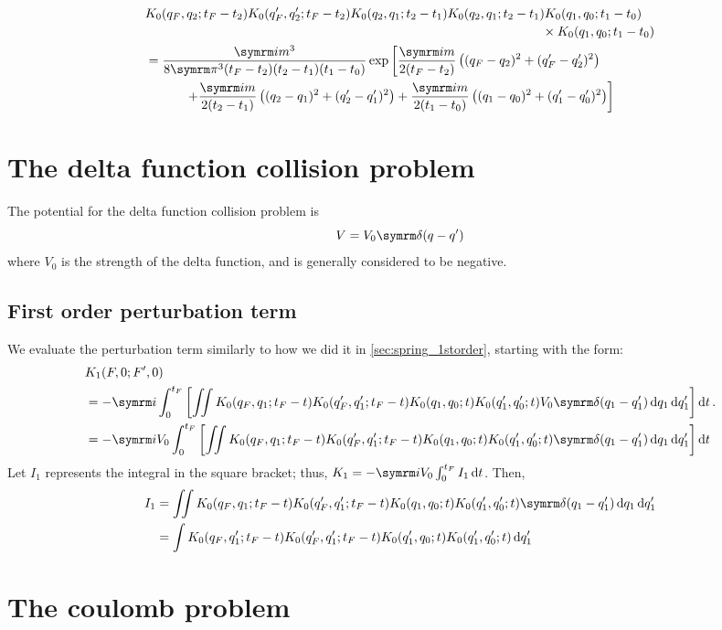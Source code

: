 \begin{align}
    &\begin{multlined}[t]
        K_0(q_F, q_2; t_F - t_2)K_0(q_F', q_2'; t_F - t_2)K_0(q_2, q_1; t_2 - t_1)K_0(q_2, q_1; t_2 - t_1)K_0(q_1, q_0; t_1 - t_0) \\ \times K_0(q_1, q_0; t_1 - t_0)
    \end{multlined} \nonumber \\
    &= \begin{multlined}[t]
        \frac{\im m^3}{8\cpi^3(t_F - t_2)(t_2 - t_1)(t_1 - t_0)}\exp \left[\frac{\im m}{2(t_F - t_2)}\left((q_F - q_2)^2 + (q_F' - q_2')^2\right) \right. \\ \left. + \frac{\im m}{2(t_2 - t_1)}\left((q_2 - q_1)^2 + (q_2' - q_1')^2\right) + \frac{\im m}{2(t_1 - t_0)}\left((q_1 - q_0)^2 + (q_1' - q_0')^2\right)\right]
    \end{multlined}
\end{align}

\section{The delta function collision problem}

The potential for the delta function collision problem is
\begin{equation}
    V = V_0\ddel(q - q')
\end{equation}
where $V_0$ is the strength of the delta function, and is generally considered to be negative.

\subsection{First order perturbation term}

We evaluate the perturbation term similarly to how we did it in \cref{sec:spring_1storder}, starting with the form:
\begin{align}
    &K_1(F, 0; F', 0) \\
    &= -\im\int_0^{t_F}\left[\iint K_0(q_F, q_1; t_F - t)K_0(q_F', q_1'; t_F - t)K_0(q_1, q_0; t)K_0(q_1', q_0'; t)V_0\ddel(q_1 - q_1')\dd{q_1}\dd{q_1'}\right]\dd{t}. \nonumber \\
    &= -\im V_0\int_0^{t_F}\left[\iint K_0(q_F, q_1; t_F - t)K_0(q_F', q_1'; t_F - t)K_0(q_1, q_0; t)K_0(q_1', q_0'; t)\ddel(q_1 - q_1')\dd{q_1}\dd{q_1'}\right]\dd{t} \nonumber
\end{align}
Let $I_1$ represents the integral in the square bracket; thus, $K_1 = -\im V_0\int_{0}^{t_F}I_1\dd{t}$. Then,
\begin{align}
    I_1 &= \iint K_0(q_F, q_1; t_F - t)K_0(q_F', q_1'; t_F - t)K_0(q_1, q_0; t)K_0(q_1', q_0'; t)\ddel(q_1 - q_1')\dd{q_1}\dd{q_1'} \\
    &= \int K_0(q_F, q_1'; t_F - t)K_0(q_F', q_1'; t_F - t)K_0(q_1', q_0; t)K_0(q_1', q_0'; t)\dd{q_1'}
\end{align}

\section{The coulomb problem}